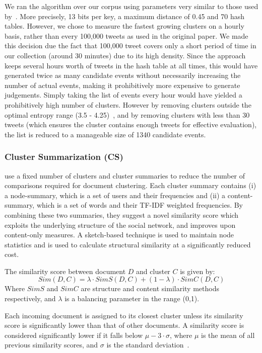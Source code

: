 We ran the algorithm over our corpus using parameters very similar to those used by~\cite{Petrovic:2010:SFS:1857999.1858020}.
More precisely, 13 bits per key, a maximum distance of 0.45 and 70 hash tables.
However, we chose to measure the fastest growing clusters on a hourly basis, rather than every 100,000 tweets as used in the original paper.
We made this decision due the fact that 100,000 tweet covers only a short period of time in our collection (around 30 minutes) due to its high density.
Since the approach keeps several hours worth of tweets in the hash table at all times, this would have generated twice as many candidate events without necessarily increasing the number of actual events, making it prohibitively more expensive to generate judgements.
Simply taking the list of events every hour would have yielded a prohibitively high number of clusters.
However by removing clusters outside the optimal entropy range (3.5 - 4.25)~\citep{Petrovic:2010:SFS:1857999.1858020}, and by removing clusters with less than 30 tweets (which ensures the cluster contains enough tweets for effective evaluation), the list is reduced to a manageable size of 1340 candidate events.


\subsubsection{Cluster Summarization (CS)}
\cite{aggarwalevent} use a fixed number of clusters and cluster summaries to reduce the number of comparisons required for document clustering.
Each cluster summary contains (i) a node-summary, which is a set of users and their frequencies and (ii) a content-summary, which is a set of words and their TF-IDF weighted frequencies.
By combining these two summaries, they suggest a novel similarity score which exploits the underlying structure of the social network, and improves upon content-only measures.
A sketch-based technique is used to maintain node statistics and is used to calculate structural similarity at a significantly reduced cost.

The similarity score between document \(D\) and cluster \(C\) is given by:
\[
Sim(D,C) = \lambda \cdot SimS(D,C) + (1 - \lambda) \cdot SimC(D,C)
\]
Where \(SimS\) and \(SimC\) are structure and content similarity methods respectively, and \(\lambda\) is a balancing parameter in the range (0,1).

Each incoming document is assigned to its closest cluster unless its similarity score is significantly lower than that of other documents.
A similarity score is considered significantly lower if it falls below \(\mu - 3 \cdot \sigma\), where \(\mu\) is the mean of all previous similarity scores, and \(\sigma\) is the standard deviation~\citep{Pukelsheim94}.

